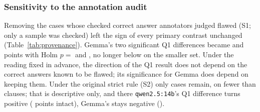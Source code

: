 \subsubsection{Sensitivity to the annotation audit}
\label{sec:res-sens}
Removing the cases whose checked correct answer annotators judged flawed (S1; only a sample was checked) left the sign
of every primary contrast unchanged (Table~\ref{tab:provenance}). Gemma's two significant Q1 differences became
\SOneDiffNetIntactGemma{} and \SOneDiffNetSpuriousTenGemma{} points with Holm $p=$ \SOnePHolmNetIntactGemma{} and
\SOnePHolmNetSpuriousTenGemma, no longer below \Alpha{} on the smaller set. Under the reading fixed in advance, the
direction of the Q1 result does not depend on the correct answers known to be flawed; its significance for Gemma does
depend on keeping them. Under the original strict rule (S2) only \NStrictKept{} cases remain, on fewer than \MinClauses{} clauses; that
is descriptive only, and there \texttt{qwen2.5:14b}'s Q1 difference turns positive (\STwoDiffNetIntactQwenFourteen{}
points intact), Gemma's stays negative (\STwoDiffNetIntactGemma).

